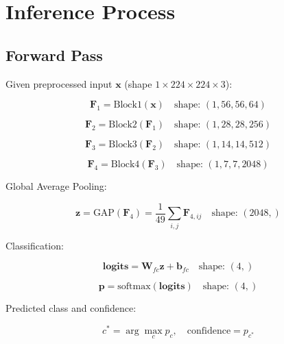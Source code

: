 \documentclass[12pt,a4paper,oneside]{book}
\begin{document}
\section{Inference Process}

\subsection{Forward Pass}

Given preprocessed input $\mathbf{x}$ (shape $1 \times 224 \times 224 \times 3$):

\begin{equation}
\mathbf{F}_1 = \text{Block1}(\mathbf{x}) \quad \text{shape: } (1, 56, 56, 64)
\label{eq:forward_1}
\end{equation}

\begin{equation}
\mathbf{F}_2 = \text{Block2}(\mathbf{F}_1) \quad \text{shape: } (1, 28, 28, 256)
\label{eq:forward_2}
\end{equation}

\begin{equation}
\mathbf{F}_3 = \text{Block3}(\mathbf{F}_2) \quad \text{shape: } (1, 14, 14, 512)
\label{eq:forward_3}
\end{equation}

\begin{equation}
\mathbf{F}_4 = \text{Block4}(\mathbf{F}_3) \quad \text{shape: } (1, 7, 7, 2048)
\label{eq:forward_4}
\end{equation}

Global Average Pooling:

\begin{equation}
\mathbf{z} = \text{GAP}(\mathbf{F}_4) = \frac{1}{49}\sum_{i,j} \mathbf{F}_{4,ij} \quad \text{shape: } (2048,)
\label{eq:gap}
\end{equation}

Classification:

\begin{equation}
\mathbf{logits} = \mathbf{W}_{fc} \mathbf{z} + \mathbf{b}_{fc} \quad \text{shape: } (4,)
\label{eq:logits}
\end{equation}

\begin{equation}
\mathbf{p} = \text{softmax}(\mathbf{logits}) \quad \text{shape: } (4,)
\label{eq:softmax}
\end{equation}

Predicted class and confidence:

\begin{equation}
c^* = \arg\max_c p_c, \quad \text{confidence} = p_{c^*}
\label{eq:prediction}
\end{equation}
\end{document}
